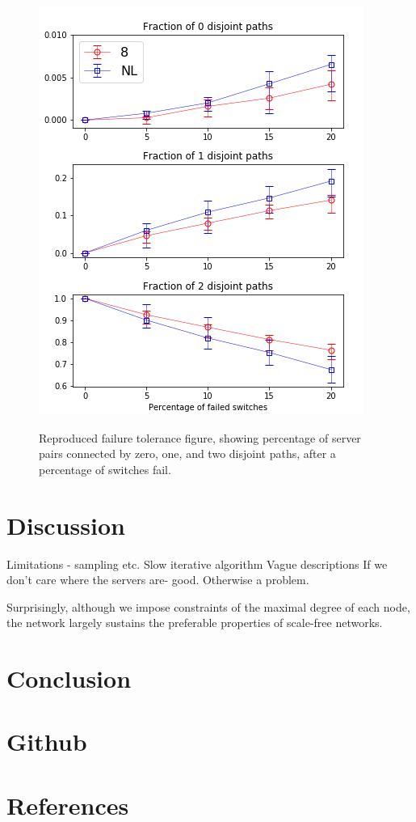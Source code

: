 \vspace{3pt}
\begin{figure}[h!]
\centering
   \includegraphics[width=1\linewidth]{figures/error}
   \label{fig:Ng2}

\caption{Reproduced failure tolerance figure, showing percentage of server pairs connected by zero, one, and two disjoint paths, after a percentage of switches fail.}
\end{figure}

\section{Discussion}

Limitations - sampling etc.
Slow iterative algorithm
Vague descriptions 
If we don't care where the servers are- good. Otherwise a problem.

Surprisingly, although we impose constraints of the maximal degree of each node, the network largely sustains the preferable properties of scale-free networks.

\section{Conclusion}

\section{Github}

\section{References}

